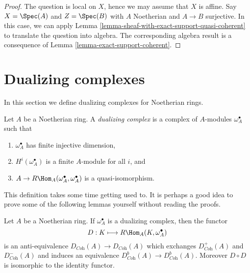 \begin{proof}
The question is local on $X$, hence we may assume that $X$ is affine.
Say $X = \Spec(A)$ and $Z = \Spec(B)$ with $A$ Noetherian and
$A \to B$ surjective. In this case, we can apply
Lemma \ref{lemma-sheaf-with-exact-support-quasi-coherent}
to translate the question into algebra.
The corresponding algebra result is a consequence of
Lemma \ref{lemma-exact-support-coherent}.
\end{proof}






\section{Dualizing complexes}
\label{section-dualizing}

\noindent
In this section we define dualizing complexes for Noetherian rings.

\begin{definition}
\label{definition-dualizing}
Let $A$ be a Noetherian ring. A {\it dualizing complex} is a
complex of $A$-modules $\omega_A^\bullet$ such that
\begin{enumerate}
\item $\omega_A^\bullet$ has finite injective dimension,
\item $H^i(\omega_A^\bullet)$ is a finite $A$-module for all $i$, and
\item $A \to R\Hom_A(\omega_A^\bullet, \omega_A^\bullet)$
is a quasi-isomorphism.
\end{enumerate}
\end{definition}

\noindent
This definition takes some time getting used to. It is perhaps a good
idea to prove some of the following lemmas yourself without reading
the proofs.

\begin{lemma}
\label{lemma-dualizing}
Let $A$ be a Noetherian ring. If $\omega_A^\bullet$ is a dualizing
complex, then the functor
$$
D : K \longmapsto R\Hom_A(K, \omega_A^\bullet)
$$
is an anti-equivalence $D_{\textit{Coh}}(A) \to D_{\textit{Coh}}(A)$
which exchanges $D^+_{\textit{Coh}}(A)$ and $D^-_{\textit{Coh}}(A)$
and induces an equivalence $D^b_{\textit{Coh}}(A) \to D^b_{\textit{Coh}}(A)$.
Moreover $D \circ D$ is isomorphic to the identity functor.
\end{lemma}

